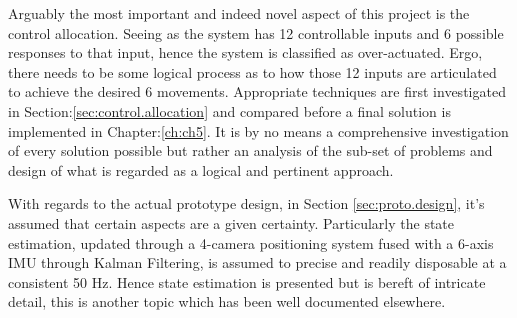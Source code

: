 \par
Arguably the most important and indeed novel aspect of this project is the control allocation. Seeing as the system has 12 controllable inputs and 6 possible responses to that input, hence the system is classified as over-actuated. Ergo, there needs to be some logical process as to how those 12 inputs are articulated to achieve the desired 6 movements. Appropriate techniques are first investigated in Section:\ref{sec:control.allocation} and compared before a final solution is implemented in Chapter:\ref{ch:ch5}. It is by no means a comprehensive investigation of every solution possible but rather an analysis of the sub-set of problems and design of what is regarded as a logical and pertinent approach.
\par
With regards to the actual prototype design, in Section \ref{sec:proto.design}, it's assumed that certain aspects are a given certainty. Particularly the state estimation, updated through a 4-camera positioning system fused with a 6-axis IMU through Kalman Filtering, is assumed to precise and readily disposable at a consistent 50 Hz. Hence state estimation is presented but is bereft of intricate detail, this is another topic which has been well documented elsewhere.
